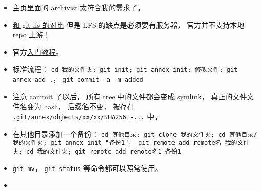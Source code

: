 
\begin{itemize}
\item \href{https://git-annex.branchable.com/}{主页}里面的 archivist 太符合我的需求了。
\item \href{https://stackoverflow.com/questions/39337586/how-do-git-lfs-and-git-annex-differ}{和 git-lfs 的对比} 但是 LFS 的缺点是必须要有服务器， 官方并不支持本地 repo 上游！
\item 官方\href{https://git-annex.branchable.com/walkthrough/}{入门教程}。
\item 标准流程： \verb`cd 我的文件夹; git init; git annex init; 修改文件; git annex add .`， \verb`git commit -a -m added`
\item 注意 commit 了以后， 所有 tree 中的文件都会变成 symlink， 真正的文件文件名变为 hash， 后缀名不变， 被存在 \verb`.git/annex/objects/xx/xx/SHA256E-...` 中。
\item 在其他目录添加一个备份： \verb`cd 其他目录; git clone 我的文件夹; cd 其他目录/我的文件夹; git annex init "备份1"， git remote add remote名 我的文件夹; cd 我的文件夹; git remote add remote名1 备份1`
\item \verb`git mv`， \verb`git status` 等命令都可以照常使用。
\item 
\end{itemize}
